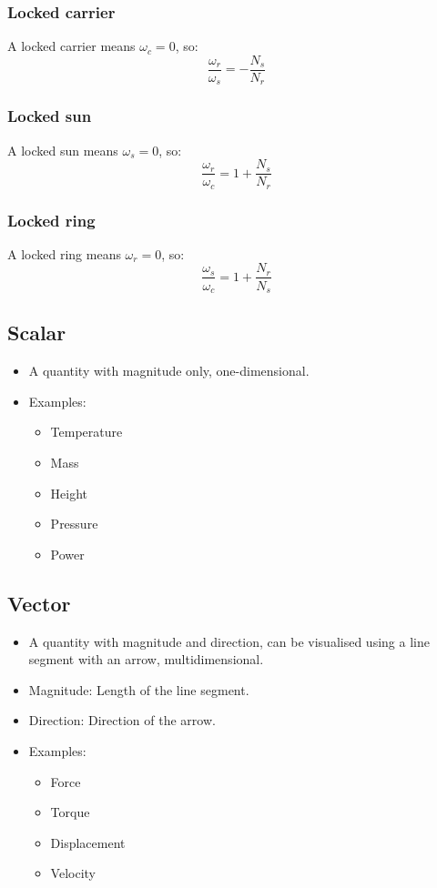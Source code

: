\documentclass[11pt]{article}
\begin{document}
\subsubsection{Locked carrier}
\label{sec:org76b3c76}
A locked carrier means \(\omega_c = 0\), so:
\[\frac{\omega_r}{\omega_s} = - \frac{N_s}{N_r}\]
\subsubsection{Locked sun}
\label{sec:org4eb801e}
A locked sun means \(\omega_s = 0\), so:
\[\frac{\omega_r}{\omega_c} = 1 + \frac{N_s}{N_r}\]
\subsubsection{Locked ring}
\label{sec:org83852b4}
A locked ring means \(\omega_r = 0\), so:
\[\frac{\omega_s}{\omega_c} = 1 + \frac{N_r}{N_s}\]
\subsection{Scalar}
\label{sec:org8cfb009}
\begin{itemize}
\item A quantity with magnitude only, one-dimensional.
\item Examples:
\begin{itemize}
\item Temperature
\item Mass
\item Height
\item Pressure
\item Power
\end{itemize}
\end{itemize}
\subsection{Vector}
\label{sec:orge30dcee}
\begin{itemize}
\item A quantity with magnitude and direction, can be visualised using a line segment with an arrow, multidimensional.
\item Magnitude: Length of the line segment.
\item Direction: Direction of the arrow.
\item Examples:
\begin{itemize}
\item Force
\item Torque
\item Displacement
\item Velocity
\end{itemize}
\end{itemize}
\end{document}
